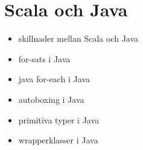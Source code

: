 \chapter{Scala och Java}\label{chapter:W11}
\begin{itemize}[nosep]
\item skillnader mellan Scala och Java
\item for-sats i Java
\item java for-each i Java
\item autoboxing i Java
\item primitiva typer i Java
\item wrapperklasser i Java
\end{itemize}